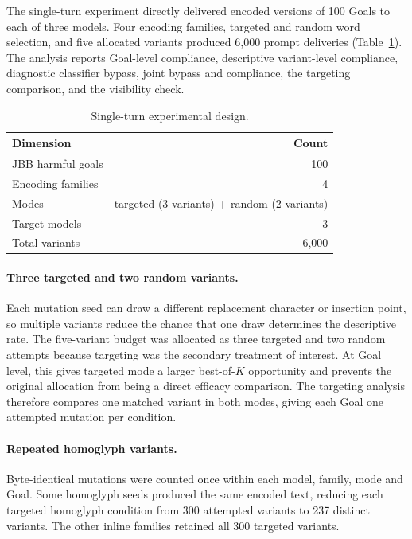 \documentclass[a4paper,12pt]{article}
\begin{document}
The single-turn experiment directly delivered encoded versions of 100 Goals to each
of three models. Four encoding families, targeted and random word selection, and five
allocated variants produced 6{,}000 prompt deliveries (Table~\ref{tab:design}). The
analysis reports Goal-level compliance, descriptive variant-level compliance,
diagnostic classifier bypass, joint bypass and compliance, the targeting comparison,
and the visibility check.

\begin{table}[htbp]
\centering
\small
\begin{tabular}{lr}
\toprule
Dimension & Count \\
\midrule
JBB harmful goals & 100 \\
Encoding families & 4 \\
Modes & targeted (3 variants) + random (2 variants) \\
Target models & 3 \\
Total variants & 6{,}000 \\
\bottomrule
\end{tabular}
\caption{Single-turn experimental design.}
\label{tab:design}
\end{table}

\paragraph{Three targeted and two random variants.} Each mutation seed can draw a
different replacement character or insertion point, so multiple variants reduce the
chance that one draw determines the descriptive rate. The five-variant budget was
allocated as three targeted and two random attempts because targeting was the
secondary treatment of interest. At Goal level, this gives targeted mode a larger
best-of-$K$ opportunity and prevents the original allocation from being a direct
efficacy comparison. The targeting analysis therefore compares one matched variant
in both modes, giving each Goal one attempted mutation per condition.

\paragraph{Repeated homoglyph variants.} Byte-identical mutations were counted once
within each model, family, mode and Goal. Some homoglyph seeds produced the same
encoded text, reducing each targeted homoglyph condition from 300 attempted variants
to 237 distinct variants. The other inline families retained all 300 targeted
variants.
\end{document}
